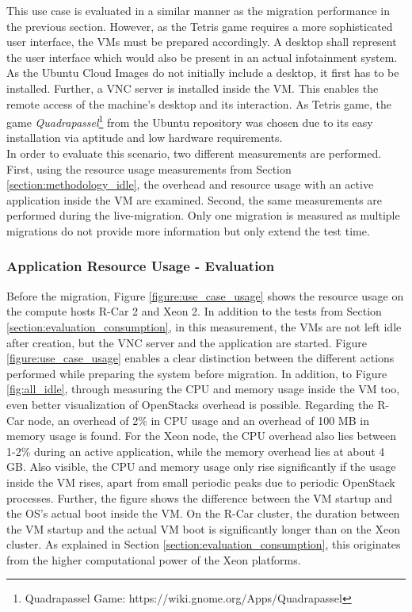         \noindent This use case is evaluated in a similar manner as the migration performance in the previous section.
        However, as the Tetris game requires a more sophisticated user interface, the VMs must be prepared accordingly.
        A desktop shall represent the user interface which would also be present in an actual infotainment system.
        As the Ubuntu Cloud Images do not initially include a desktop, it first has to be installed.
        Further, a \ac{VNC} server is installed inside the \ac{VM}.
        This enables the remote access of the machine's desktop and its interaction.
        As Tetris game, the game \textit{Quadrapassel}\footnote{Quadrapassel Game: https://wiki.gnome.org/Apps/Quadrapassel} from the Ubuntu repository was chosen due to its easy installation via aptitude and low hardware requirements.\\
        In order to evaluate this scenario, two different measurements are performed.
        First, using the resource usage measurements from Section \ref{section:methodology_idle}, the overhead and resource usage with an active application inside the \ac{VM} are examined.
        Second, the same measurements are performed during the live-migration.
        Only one migration is measured as multiple migrations do not provide more information but only extend the test time.
        
         \subsubsection*{Application Resource Usage - Evaluation}
        
            \noindent Before the migration, Figure \ref{figure:use_case_usage} shows the resource usage on the compute hosts R-Car 2 and Xeon 2.
            In addition to the tests from Section \ref{section:evaluation_consumption}, in this measurement, the \acp{VM} are not left idle after creation, but the \ac{VNC} server and the application are started.
            Figure \ref{figure:use_case_usage} enables a clear distinction between the different actions performed while preparing the system before migration. 
            In addition, to Figure \ref{fig:all_idle}, through measuring the \ac{CPU} and memory usage inside the \ac{VM} too, even better visualization of OpenStacks overhead is possible.
            Regarding the R-Car node, an overhead of 2\% in \ac{CPU} usage and an overhead of 100 MB in memory usage is found.
            For the Xeon node, the \ac{CPU} overhead also lies between 1-2\% during an active application, while the memory overhead lies at about 4 GB.
            Also visible, the \ac{CPU} and memory usage only rise significantly if the usage inside the \ac{VM} rises, apart from small periodic peaks due to periodic OpenStack processes.
            Further, the figure shows the difference between the \ac{VM} startup and the OS's actual boot inside the \ac{VM}.
            On the R-Car cluster, the duration between the \ac{VM} startup and the actual \ac{VM} boot is significantly longer than on the Xeon cluster.
            As explained in Section \ref{section:evaluation_consumption}, this originates from the higher computational power of the Xeon platforms.
            
